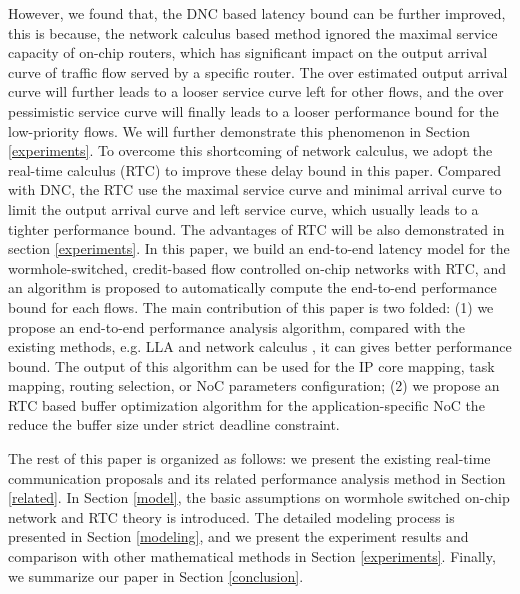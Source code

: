 \documentclass[10pt,journal]{IEEEtran}
\begin{document}
However, we found that, the DNC based latency bound can be further improved, this is because, the network calculus based method \cite{Qian489900} ignored the maximal service capacity of on-chip routers, which has significant impact on the output arrival curve of traffic flow served by a specific router. The over estimated output arrival curve will further leads to a looser service curve left for other flows, and the over pessimistic service curve will finally leads to a looser performance bound for the low-priority flows. We will further demonstrate this phenomenon in Section \ref{experiments}. To overcome this shortcoming of network calculus, we adopt the real-time calculus (RTC) to improve these delay bound in this paper. Compared with DNC, the RTC use the maximal service curve and minimal arrival curve to limit the output arrival curve and left service curve, which usually leads to a tighter performance bound. The advantages of RTC will be also demonstrated in section \ref{experiments}. In this paper, we build an end-to-end latency model for the wormhole-switched, credit-based flow controlled on-chip networks with RTC, and an algorithm is proposed to automatically compute the end-to-end performance bound for each flows. The main contribution of this paper is two folded: (1) we propose an end-to-end performance analysis algorithm, compared with the existing methods, e.g. LLA \cite{73}\cite{189} and network calculus \cite{Qian489900}, it can gives better performance bound. The output of this algorithm can be used for the IP core mapping, task mapping, routing selection, or NoC parameters configuration; (2) we propose an RTC based buffer optimization algorithm for the application-specific NoC the reduce the buffer size under strict deadline constraint.

The rest of this paper is organized as follows: we present the existing real-time communication proposals and its related performance analysis method in Section \ref{related}. In Section \ref{model}, the basic assumptions on wormhole switched on-chip network and RTC theory is introduced. The detailed modeling process is presented in Section \ref{modeling}, and we present the experiment results and comparison with other mathematical methods in Section \ref{experiments}. Finally, we summarize our paper in Section \ref{conclusion}.
\end{document}
